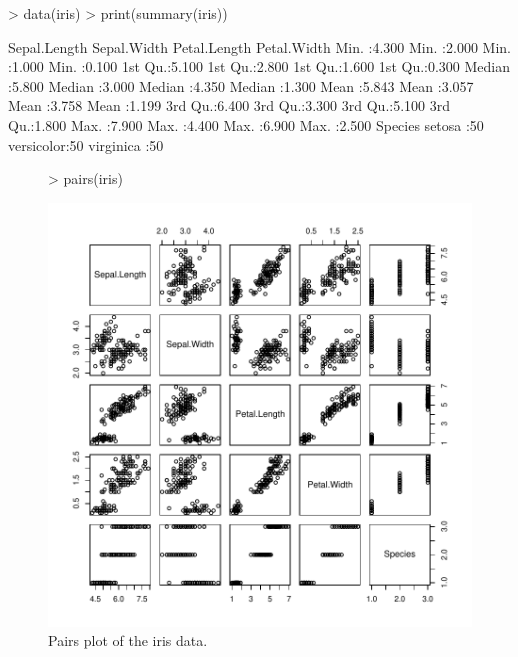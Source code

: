 \documentclass[a4paper]{article}
\begin{document}
\begin{Sinput}
> data(iris)
> print(summary(iris))
\end{Sinput}
\begin{Soutput}
  Sepal.Length    Sepal.Width     Petal.Length    Petal.Width   
 Min.   :4.300   Min.   :2.000   Min.   :1.000   Min.   :0.100  
 1st Qu.:5.100   1st Qu.:2.800   1st Qu.:1.600   1st Qu.:0.300  
 Median :5.800   Median :3.000   Median :4.350   Median :1.300  
 Mean   :5.843   Mean   :3.057   Mean   :3.758   Mean   :1.199  
 3rd Qu.:6.400   3rd Qu.:3.300   3rd Qu.:5.100   3rd Qu.:1.800  
 Max.   :7.900   Max.   :4.400   Max.   :6.900   Max.   :2.500  
       Species  
 setosa    :50  
 versicolor:50  
 virginica :50  
\end{Soutput}

\begin{figure}[tbph]
\begin{center}
\begin{Sinput}
> pairs(iris)
\end{Sinput}
\includegraphics{Sweave-test-1-006}
\end{center}
\caption{Pairs plot of the iris data.}
\end{figure}
\end{document}
